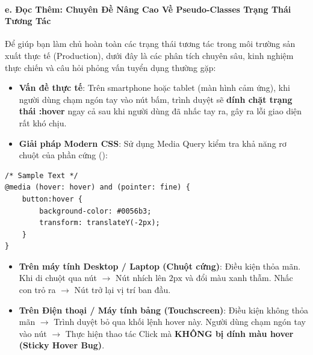 \paragraph{e. Đọc Thêm: Chuyên Đề Nâng Cao Về Pseudo-Classes Trạng Thái Tương Tác}

Để giúp bạn làm chủ hoàn toàn các trạng thái tương tác trong môi trường sản xuất thực tế (Production), dưới đây là các phân tích chuyên sâu, kinh nghiệm thực chiến và câu hỏi phỏng vấn tuyển dụng thường gặp:

\begin{conceptBox}
\begin{itemize}[leftmargin=1.5em, itemsep=3pt, parsep=0pt]
    \item \textbf{Vấn đề thực tế}: Trên smartphone hoặc tablet (màn hình cảm ứng), khi người dùng chạm ngón tay vào nút bấm, trình duyệt sẽ \textbf{dính chặt trạng thái :hover} ngay cả sau khi người dùng đã nhấc tay ra, gây ra lỗi giao diện rất khó chịu.
    \item \textbf{Giải pháp Modern CSS}: Sử dụng Media Query kiểm tra khả năng rơ chuột của phần cứng ():
\end{itemize}
\begin{codeWindow}
\begin{lstlisting}[language=CSS3]
/* Sample Text */
@media (hover: hover) and (pointer: fine) {
    button:hover {
        background-color: #0056b3;
        transform: translateY(-2px);
    }
}
\end{lstlisting}
\end{codeWindow}

\begin{browserWindow}
\begin{itemize}[leftmargin=1.5em, itemsep=3pt, parsep=0pt]
    \item \textbf{Trên máy tính Desktop / Laptop (Chuột cứng)}: Điều kiện  thỏa mãn. Khi di chuột qua nút $\rightarrow$ Nút nhích lên $2\text{px}$ và đổi màu xanh thẫm. Nhấc con trỏ ra $\rightarrow$ Nút trở lại vị trí ban đầu.
    \item \textbf{Trên Điện thoại / Máy tính bảng (Touchscreen)}: Điều kiện  không thỏa mãn $\rightarrow$ Trình duyệt bỏ qua khối lệnh hover này. Người dùng chạm ngón tay vào nút $\rightarrow$ Thực hiện thao tác Click mà \textbf{KHÔNG bị dính màu hover (Sticky Hover Bug)}.
\end{itemize}
\end{browserWindow}
\end{conceptBox}

